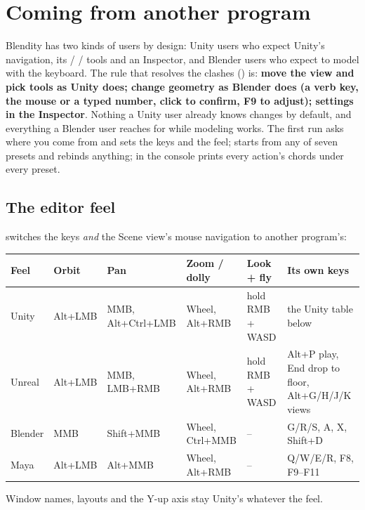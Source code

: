 \chapter{Coming from another program}
\label{ch:comingfrom}

Blendity has two kinds of users by design: Unity users who expect Unity's navigation, its  /  / 
tools and an Inspector, and Blender users who expect to model with the keyboard. The rule that resolves the clashes
() is: \textbf{move the view and pick tools as Unity does; change geometry as Blender does
(a verb key, the mouse or a typed number, click to confirm, F9 to adjust); settings in the Inspector}. Nothing a Unity
user already knows changes by default, and everything a Blender user reaches for while modeling works. The first run
asks where you come from and sets the keys and the feel;  starts from any of seven
presets and rebinds anything;  in the console prints every action's chords under every preset.

\section{The editor feel}
 switches the keys \emph{and} the Scene view's mouse navigation to another program's:

\begin{center}
\small
\begin{tabularx}{\textwidth}{l>{\raggedright\arraybackslash}p{16mm}>{\raggedright\arraybackslash}p{26mm}>{\raggedright\arraybackslash}p{24mm}>{\raggedright\arraybackslash}p{24mm}X}
\toprule
Feel & Orbit & Pan & Zoom / dolly & Look + fly & Its own keys \\
\midrule
Unity & Alt+LMB & MMB, Alt+Ctrl+LMB & Wheel, Alt+RMB & hold RMB + WASD & the Unity table below \\
Unreal & Alt+LMB & MMB, LMB+RMB & Wheel, Alt+RMB & hold RMB + WASD & Alt+P play, End drop to floor, Alt+G/H/J/K views \\
Blender & MMB & Shift+MMB & Wheel, Ctrl+MMB & -- & G/R/S, A, X, Shift+D \\
Maya & Alt+LMB & Alt+MMB & Wheel, Alt+RMB & -- & Q/W/E/R, F8, F9--F11 \\
\bottomrule
\end{tabularx}
\end{center}

Window names, layouts and the Y-up axis stay Unity's whatever the feel.

